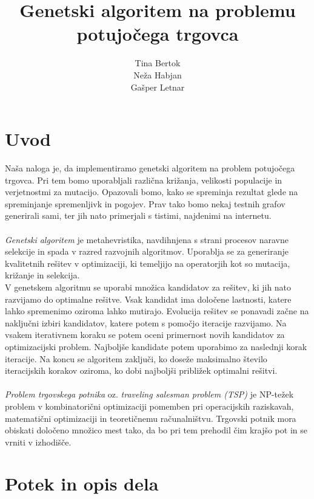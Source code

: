 \documentclass[a4paper]{article}
\title{Genetski algoritem na problemu potujočega trgovca}
\author{Tina Bertok\\ Neža Habjan \\ Gašper Letnar}
\begin{document}
\maketitle
\newpage

\section{Uvod}

Naša naloga je, da implementiramo genetski algoritem na problem potujočega trgovca. Pri tem bomo uporabljali različna križanja, velikosti populacije in verjetnostmi za mutacijo. Opazovali bomo, kako se spreminja rezultat glede na spreminjanje spremenljivk in pogojev. Prav tako bomo nekaj testnih grafov generirali sami, ter jih nato primerjali s tistimi, najdenimi na internetu. 
\\
\\
\textit{Genetski algoritem} je metahevristika, navdihnjena s strani procesov naravne selekcije in spada v razred razvojnih
algoritmov. Uporablja se za generiranje kvalitetnih rešitev v optimizaciji, ki temeljijo na operatorjih kot so mutacija, križanje
in selekcija.  
\\
V genetskem algoritmu se uporabi množica kandidatov za rešitev, ki jih nato razvijamo do optimalne rešitve. Vsak kandidat
ima določene lastnosti, katere lahko spremenimo oziroma lahko mutirajo. Evolucija rešitev se ponavadi začne na naključni izbiri kandidatov, katere potem s pomočjo iteracije razvijamo. Na vsakem iterativnem koraku se potem oceni primernost novih kandidatov za optimizacijski problem. Najboljše kandidate potem uporabimo za naslednji korak iteracije. Na koncu se algoritem zaključi, ko doseže maksimalno število iteracijskih korakov oziroma, ko dobi najboljši približek optimalni rešitvi.
\\
\\
\textit{Problem trgovskega potnika} oz. \textit{traveling salesman problem (TSP)} je NP-težek problem v kombinatorični optimizaciji pomemben pri operacijskih raziskavah, matematični optimizaciji in teoretičnemu računalništvu. Trgovski potnik mora obiskati določeno množico mest tako, da bo pri tem prehodil čim krajšo pot in se vrniti v izhodišče.


\newpage
\section{Potek in opis dela}
\end{document}
